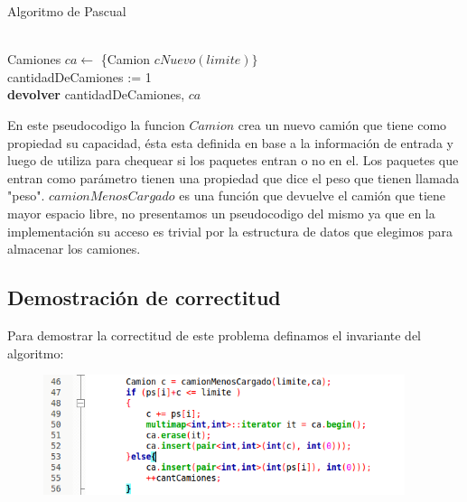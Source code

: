 \begin{algorithm}[H]
	\SetAlgoLined
	\caption{Algoritmo de Pascual}
	\\
	
	Camiones $ca \leftarrow$ \{Camion $cNuevo(limite)\}$\\
	cantidadDeCamiones := 1\\
	\textbf{devolver} cantidadDeCamiones, $ca$
\end{algorithm}

En este pseudocodigo la funcion $Camion$ crea un nuevo cami\'on que tiene como propiedad su capacidad, \'esta esta definida en base a la informaci\'on de entrada y luego de utiliza para chequear si los paquetes entran o no en el. Los paquetes que entran como par\'ametro tienen una propiedad que dice el peso que tienen llamada "peso". $camionMenosCargado$ es una funci\'on que devuelve el cami\'on que tiene mayor espacio libre, no presentamos un pseudocodigo del mismo ya que en la implementaci\'on su acceso es trivial por la estructura de datos que elegimos para almacenar los camiones.

\subsection{Demostración de correctitud}

Para demostrar la correctitud de este problema definamos el invariante del algoritmo:
\begin{figure}[H] %
\begin{center}
\includegraphics[width=300pt]{../imgs/demo11.png}
\end{center}
\end{figure}

